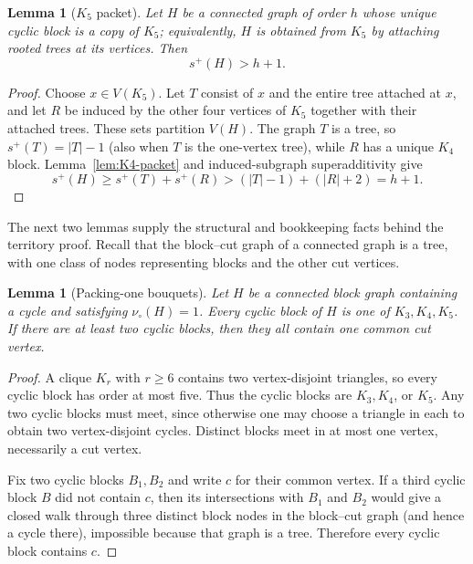 \documentclass[11pt]{article}
\newtheorem{lemma}[theorem]{Lemma}
\theoremstyle{definition}
\theoremstyle{remark}
\newcommand{\vp}{\nu_{\circ}}
\begin{document}
\begin{lemma}[$K_5$ packet]\label{lem:K5-packet}
Let $H$ be a connected graph of order $h$ whose unique cyclic block is a
copy of $K_5$; equivalently, $H$ is obtained from $K_5$ by attaching rooted
trees at its vertices.  Then
\[
 s^+(H)>h+1.
\]
\end{lemma}

\begin{proof}
Choose $x\in V(K_5)$.  Let $T$ consist of $x$ and the entire tree attached
at $x$, and let $R$ be induced by the other four vertices of $K_5$ together
with their attached trees.  These sets partition $V(H)$.  The graph $T$ is
a tree, so $s^+(T)=|T|-1$ (also when $T$ is the one-vertex tree), while $R$
has a unique $K_4$ block.  Lemma~\ref{lem:K4-packet} and induced-subgraph
superadditivity give
\[
 s^+(H)\ge s^+(T)+s^+(R)
 >(|T|-1)+(|R|+2)=h+1.
\]
\end{proof}

The next two lemmas supply the structural and bookkeeping facts behind the
territory proof.  Recall that the block--cut graph of a connected graph is a
tree, with one class of nodes representing blocks and the other cut vertices.

\begin{lemma}[Packing-one bouquets]\label{lem:packing-one-bouquet}
Let $H$ be a connected block graph containing a cycle and satisfying
$\vp(H)=1$.  Every cyclic block of $H$ is one of $K_3,K_4,K_5$.  If there are
at least two cyclic blocks, then they all contain one common cut vertex.
\end{lemma}

\begin{proof}
A clique $K_r$ with $r\ge6$ contains two vertex-disjoint triangles, so every
cyclic block has order at most five.  Thus the cyclic blocks are $K_3,K_4$, or
$K_5$.  Any two cyclic blocks must meet, since otherwise one may choose a
triangle in each to obtain two vertex-disjoint cycles.  Distinct blocks meet
in at most one vertex, necessarily a cut vertex.

Fix two cyclic blocks $B_1,B_2$ and write $c$ for their common vertex.  If a
third cyclic block $B$ did not contain $c$, then its intersections with
$B_1$ and $B_2$ would give a closed walk through three distinct block nodes
in the block--cut graph (and hence a cycle there), impossible because that
graph is a tree.  Therefore every cyclic block contains $c$.
\end{proof}
\end{document}
